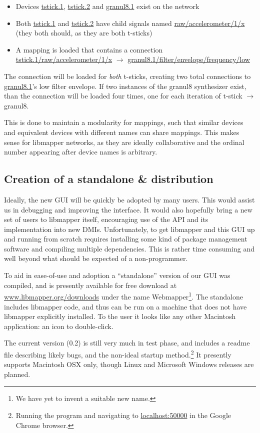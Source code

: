 \begin{itemize}
	\item Devices \url{tstick.1}, \url{tstick.2} and \url{granul8.1} exist on the network
	\item Both \url{tstick.1} and \url{tstick.2} have child signals named \url{raw/accelerometer/1/x} (they both should, as they are both t-sticks)
	\item A mapping is loaded that contains a connection \url{tstick.1/raw/accelerometer/1/x} $\rightarrow$ \url{granul8.1/filter/envelope/frequency/low}
\end{itemize}

The connection will be loaded for \emph{both} t-sticks, creating two total connections to \url{granul8.1}'s low filter envelope. If two instances of the granul8 synthesizer exist, than the connection will be loaded four times, one for each iteration of t-stick $\rightarrow$ granul8.

This is done to maintain a modularity for mappings, such that similar devices and equivalent devices with different names can share mappings. This makes sense for libmapper networks, as they are ideally collaborative and the ordinal number appearing after device names is arbitrary. 
	

	\subsection{Creation of a standalone \& distribution} %
	\label{sec:creation_of_a_standalone_and_distribution}
	
Ideally, the new GUI will be quickly be adopted by many users. This would assist us in debugging and improving the interface. It would also hopefully bring a new set of users to libmapper itself, encouraging use of the API and its implementation into new DMIs. Unfortunately, to get libmapper and this GUI up and running from scratch requires installing some kind of package management software and compiling multiple dependencies. This is rather time consuming and well beyond what should be expected of a non-programmer. 

To aid in ease-of-use and adoption a ``standalone'' version of our GUI was compiled, and is presently available for free download at \url{www.libmapper.org/downloads} under the name Webmapper\footnote{We have yet to invent a suitable new name.}. The standalone includes libmapper code, and thus can be run on a machine that does not have libmapper explicitly installed. To the user it looks like any other Macintosh application: an icon to double-click.

The current version (0.2) is still very much in test phase, and includes a readme file describing likely bugs, and the non-ideal startup method.\footnote{Running the program and navigating to \url{localhost:50000} in the Google Chrome browser.} It presently supports Macintosh OSX only, though Linux and Microsoft Windows releases are planned.






